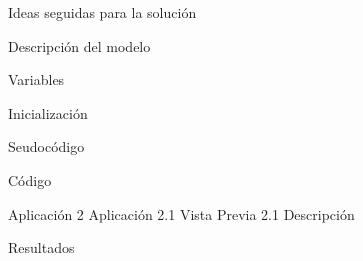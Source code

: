 \documentclass[]{article}
\begin{document}
\begin{section} {Ideas seguidas para la soluci\'{o}n}
\begin{subsection} {Descripci\'{o}n del modelo}
\end{subsection}

\begin{subsection} {Variables}
\end{subsection}

\begin{subsection} {Inicialización }
\end{subsection}

\begin{subsection} {Seudocódigo}
\end{subsection}

\begin{subsection} {C\'{o}digo}

\begin{center}

\end{center}

\end{subsection}

\end{section}


\begin{section} {Aplicaci\'{o}n}
2 Aplicación
2.1 Vista Previa
2.1 Descripción
\end{section}

\begin{section} {Resultados}
\end{section}	
\end{document}
